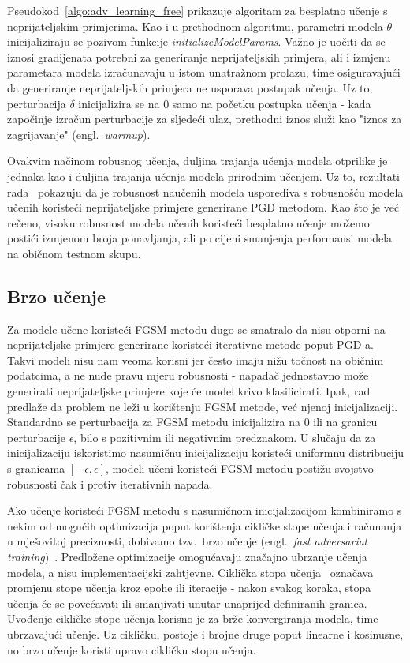 \documentclass[times, utf8, zavrsni, numeric]{fer}
\begin{document}
Pseudokod~\ref{algo:adv_learning_free} prikazuje algoritam za besplatno učenje s neprijateljskim primjerima.
Kao i u prethodnom algoritmu, parametri modela $\theta$ inicijaliziraju se pozivom funkcije \textit{initializeModelParams}.
Važno je uočiti da se iznosi gradijenata potrebni za generiranje neprijateljskih primjera, ali i izmjenu parametara modela izračunavaju u istom unatražnom prolazu,
time osiguravajući da generiranje neprijateljskih primjera ne usporava postupak učenja. 
Uz to, perturbacija $\delta$ inicijalizira se na 0 samo na početku postupka učenja - kada započinje izračun perturbacije za sljedeći ulaz, prethodni iznos služi kao "iznos za zagrijavanje" (engl.\ \textit{warmup}).

Ovakvim načinom robusnog učenja, duljina trajanja učenja modela otprilike je jednaka kao i duljina trajanja učenja modela prirodnim učenjem.
Uz to, rezultati rada~\cite{shafahi2019adversarial} pokazuju da je robusnost naučenih modela usporediva s robusnošću modela učenih koristeći neprijateljske primjere generirane PGD metodom.
Kao što je već rečeno, visoku robusnost modela učenih koristeći besplatno učenje možemo postići izmjenom broja ponavljanja, ali po cijeni smanjenja performansi modela na običnom testnom skupu.

\subsection{Brzo učenje}

Za modele učene koristeći FGSM metodu dugo se smatralo da nisu otporni na neprijateljske primjere generirane koristeći iterativne metode poput PGD-a.
Takvi modeli nisu nam veoma korisni jer često imaju nižu točnost na običnim podatcima, a ne nude pravu mjeru robusnosti - napadač jednostavno može generirati neprijateljske primjere koje će model krivo klasificirati.
Ipak, rad~\cite{wong2020fast} predlaže da problem ne leži u korištenju FGSM metode, već njenoj inicijalizaciji.
Standardno se perturbacija za FGSM metodu inicijalizira na 0 ili na granicu perturbacije $\epsilon$, bilo s pozitivnim ili negativnim predznakom.
U slučaju da za inicijalizaciju iskoristimo nasumičnu inicijalizaciju koristeći uniformnu distribuciju s granicama $[-\epsilon, \epsilon]$, 
modeli učeni koristeći FGSM metodu postižu svojstvo robusnosti čak i protiv iterativnih napada.

Ako učenje koristeći FGSM metodu s nasumičnom inicijalizacijom kombiniramo s nekim od mogućih optimizacija poput korištenja cikličke stope učenja i računanja u mješovitoj preciznosti,
dobivamo tzv.\ brzo učenje (engl.\ \textit{fast adversarial training})~\cite{wong2020fast}. Predložene optimizacije omogućavaju značajno ubrzanje učenja modela, a nisu implementacijski zahtjevne.
Ciklička stopa učenja~\cite{smith2017cyclical} označava promjenu stope učenja kroz epohe ili iteracije - nakon svakog koraka, stopa učenja će se povećavati ili smanjivati unutar unaprijed definiranih granica.
Uvođenje cikličke stope učenja korisno je za brže konvergiranja modela, time ubrzavajući učenje. 
Uz cikličku, postoje i brojne druge poput linearne i kosinusne, no brzo učenje koristi upravo cikličku stopu učenja.
\end{document}
